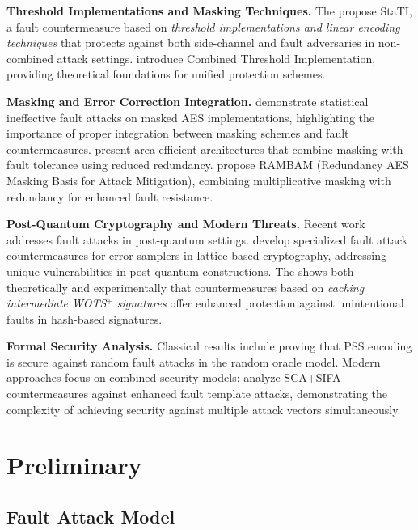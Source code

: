 \documentclass[journal=tches,final]{iacrtrans}
\begin{document}
\textbf{Threshold Implementations and Masking Techniques.} The \cite{TCHES:DhoOvcTop24} propose StaTI, a fault countermeasure based on \textit{threshold implementations and linear encoding techniques} that protects against both side-channel and fault adversaries in non-combined attack settings. \cite{TCHES:FelRic24} introduce Combined Threshold Implementation, providing theoretical foundations for unified protection schemes.

\textbf{Masking and Error Correction Integration.} \cite{ASIACRYPT:DobrEic18} demonstrate statistical ineffective fault attacks on masked AES implementations, highlighting the importance of proper integration between masking schemes and fault countermeasures. \cite{IEEE-TVLSI:MisKub21} present area-efficient architectures that combine masking with fault tolerance using reduced redundancy. \cite{TCHES:BelBugAzr22} propose RAMBAM (Redundancy AES Masking Basis for Attack Mitigation), combining multiplicative masking with redundancy for enhanced fault resistance.

\textbf{Post-Quantum Cryptography and Modern Threats.} Recent work addresses fault attacks in post-quantum settings. \cite{IEEE-HOST:HowKhaMarNor19} develop specialized fault attack countermeasures for error samplers in lattice-based cryptography, addressing unique vulnerabilities in post-quantum constructions. The \cite{TCHES:Genet23} shows both theoretically and experimentally that countermeasures based on \textit{caching intermediate WOTS$^{+}$ signatures} offer enhanced protection against unintentional faults in hash-based signatures.

\textbf{Formal Security Analysis.} Classical results include \cite{AC:CorMan09} proving that PSS encoding is secure against random fault attacks in the random oracle model. Modern approaches focus on combined security models: \cite{COSADE:SahBagJapMuk21} analyze SCA+SIFA countermeasures against enhanced fault template attacks, demonstrating the complexity of achieving security against multiple attack vectors simultaneously.

\color{black}

\section{Preliminary}

\subsection{Fault Attack Model}
\end{document}
